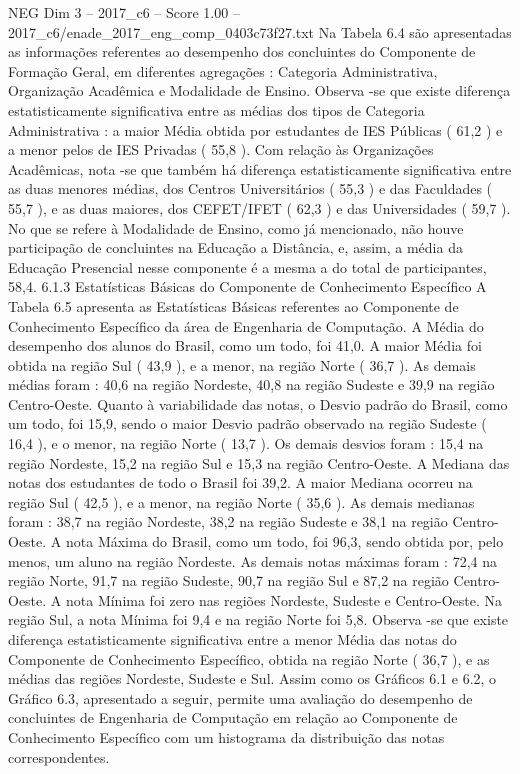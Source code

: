 \begin{textsample}{NEG Dim 3 – 2017\_c6 – Score 1.00 – 2017\_c6/enade\_2017\_eng\_comp\_0403c73f27.txt}
Na Tabela 6.4 são apresentadas as informações referentes ao desempenho dos concluintes do Componente de Formação Geral, em diferentes agregações : Categoria Administrativa, Organização Acadêmica e Modalidade de Ensino.
Observa -se que existe diferença estatisticamente significativa entre as médias dos tipos de Categoria Administrativa : a maior Média obtida por estudantes de IES Públicas ( 61,2 ) e a menor pelos de IES Privadas ( 55,8 ).
Com relação às Organizações Acadêmicas, nota -se que também há diferença estatisticamente significativa entre as duas menores médias, dos Centros Universitários ( 55,3 ) e das Faculdades ( 55,7 ), e as duas maiores, dos CEFET/IFET ( 62,3 ) e das Universidades ( 59,7 ).
No que se refere à Modalidade de Ensino, como já mencionado, não houve participação de concluintes na Educação a Distância, e, assim, a média da Educação Presencial nesse componente é a mesma a do total de participantes, 58,4. 6.1.3 Estatísticas Básicas do Componente de Conhecimento Específico A Tabela 6.5 apresenta as Estatísticas Básicas referentes ao Componente de Conhecimento Específico da área de Engenharia de Computação.
A Média do desempenho dos alunos do Brasil, como um todo, foi 41,0.
A maior Média foi obtida na região Sul ( 43,9 ), e a menor, na região Norte ( 36,7 ).
As demais médias foram : 40,6 na região Nordeste, 40,8 na região Sudeste e 39,9 na região Centro-Oeste.
Quanto à variabilidade das notas, o Desvio padrão do Brasil, como um todo, foi 15,9, sendo o maior Desvio padrão observado na região Sudeste ( 16,4 ), e o menor, na região Norte ( 13,7 ).
Os demais desvios foram : 15,4 na região Nordeste, 15,2 na região Sul e 15,3 na região Centro-Oeste.
A Mediana das notas dos estudantes de todo o Brasil foi 39,2.
A maior Mediana ocorreu na região Sul ( 42,5 ), e a menor, na região Norte ( 35,6 ).
As demais medianas foram : 38,7 na região Nordeste, 38,2 na região Sudeste e 38,1 na região Centro-Oeste.
A nota Máxima do Brasil, como um todo, foi 96,3, sendo obtida por, pelo menos, um aluno na região Nordeste.
As demais notas máximas foram : 72,4 na região Norte, 91,7 na região Sudeste, 90,7 na região Sul e 87,2 na região Centro-Oeste.
A nota Mínima foi zero nas regiões Nordeste, Sudeste e Centro-Oeste.
Na região Sul, a nota Mínima foi 9,4 e na região Norte foi 5,8.
Observa -se que existe diferença estatisticamente significativa entre a menor Média das notas do Componente de Conhecimento Específico, obtida na região Norte ( 36,7 ), e as médias das regiões Nordeste, Sudeste e Sul.
Assim como os Gráficos 6.1 e 6.2, o Gráfico 6.3, apresentado a seguir, permite uma avaliação do desempenho de concluintes de Engenharia de Computação em relação ao Componente de Conhecimento Específico com um histograma da distribuição das notas correspondentes.

\end{textsample}
